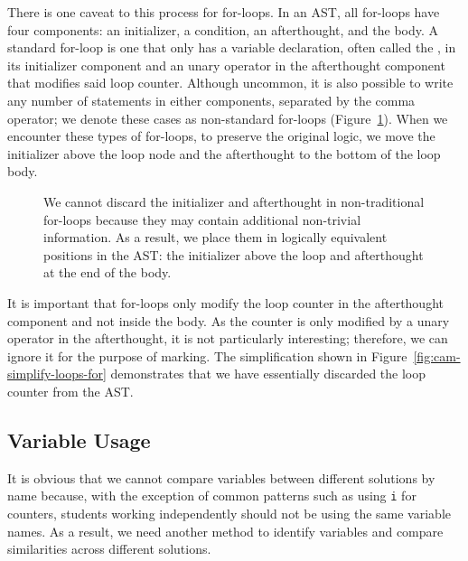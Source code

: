 There is one caveat to this process for  for-loops. In an AST, all for-loops have four components: an initializer, a condition, an afterthought, and the body. A standard for-loop is one that only has a variable declaration, often called the , in its initializer component and an unary operator in the afterthought component that modifies said loop counter. Although uncommon, it is also possible to write any number of statements in either components, separated by the comma operator; we denote these cases as non-standard for-loops (Figure~\ref{fig:cam-simplify-loops-for-nontrad}). When we encounter these types of for-loops, to preserve the original logic, we move the initializer above the loop node and the afterthought to the bottom of the loop body.

\begin{figure}


\caption[Non-Traditional For-Loops]{We cannot discard the initializer and afterthought in non-traditional for-loops because they may contain additional non-trivial information. As a result, we place them in logically equivalent positions in the AST: the initializer above the loop and afterthought at the end of the body.}
\label{fig:cam-simplify-loops-for-nontrad}
\end{figure}

It is important that  for-loops only modify the loop counter in the afterthought component and not inside the body. As the counter is only modified by a unary operator in the afterthought, it is not particularly interesting; therefore, we can ignore it for the purpose of marking. The simplification shown in Figure~\ref{fig:cam-simplify-loops-for} demonstrates that we have essentially discarded the loop counter from the AST.

\subsection{Variable Usage}
\label{sec:cam-simplify-var-usage}

It is obvious that we cannot compare variables between different solutions by name because, with the exception of common patterns such as using \texttt{i} for counters, students working independently should not be using the same variable names. As a result, we need another method to identify variables and compare similarities across different solutions.

